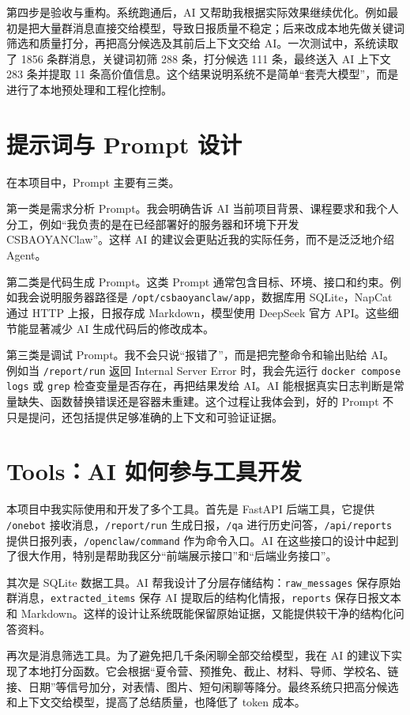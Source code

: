 \documentclass[conference]{IEEEtran}
\begin{document}
第四步是验收与重构。系统跑通后，AI 又帮助我根据实际效果继续优化。例如最初是把大量群消息直接交给模型，导致日报质量不稳定；后来改成本地先做关键词筛选和质量打分，再把高分候选及其前后上下文交给 AI。一次测试中，系统读取了 1856 条群消息，关键词初筛 288 条，打分候选 111 条，最终送入 AI 上下文 283 条并提取 11 条高价值信息。这个结果说明系统不是简单“套壳大模型”，而是进行了本地预处理和工程化控制。

\section{提示词与 Prompt 设计}

在本项目中，Prompt 主要有三类。

第一类是需求分析 Prompt。我会明确告诉 AI 当前项目背景、课程要求和我个人分工，例如“我负责的是在已经部署好的服务器和环境下开发 CSBAOYANClaw”。这样 AI 的建议会更贴近我的实际任务，而不是泛泛地介绍 Agent。

第二类是代码生成 Prompt。这类 Prompt 通常包含目标、环境、接口和约束。例如我会说明服务器路径是 \texttt{/opt/csbaoyanclaw/app}，数据库用 SQLite，NapCat 通过 HTTP 上报，日报存成 Markdown，模型使用 DeepSeek 官方 API。这些细节能显著减少 AI 生成代码后的修改成本。

第三类是调试 Prompt。我不会只说“报错了”，而是把完整命令和输出贴给 AI。例如当 \texttt{/report/run} 返回 Internal Server Error 时，我会先运行 \texttt{docker compose logs} 或 \texttt{grep} 检查变量是否存在，再把结果发给 AI。AI 能根据真实日志判断是常量缺失、函数替换错误还是容器未重建。这个过程让我体会到，好的 Prompt 不只是提问，还包括提供足够准确的上下文和可验证证据。

\section{Tools：AI 如何参与工具开发}

本项目中我实际使用和开发了多个工具。首先是 FastAPI 后端工具，它提供 \texttt{/onebot} 接收消息，\texttt{/report/run} 生成日报，\texttt{/qa} 进行历史问答，\texttt{/api/reports} 提供日报列表，\texttt{/openclaw/command} 作为命令入口。AI 在这些接口的设计中起到了很大作用，特别是帮助我区分“前端展示接口”和“后端业务接口”。

其次是 SQLite 数据工具。AI 帮我设计了分层存储结构：\texttt{raw\_messages} 保存原始群消息，\texttt{extracted\_items} 保存 AI 提取后的结构化情报，\texttt{reports} 保存日报文本和 Markdown。这样的设计让系统既能保留原始证据，又能提供较干净的结构化问答资料。

再次是消息筛选工具。为了避免把几千条闲聊全部交给模型，我在 AI 的建议下实现了本地打分函数。它会根据“夏令营、预推免、截止、材料、导师、学校名、链接、日期”等信号加分，对表情、图片、短句闲聊等降分。最终系统只把高分候选和上下文交给模型，提高了总结质量，也降低了 token 成本。
\end{document}
